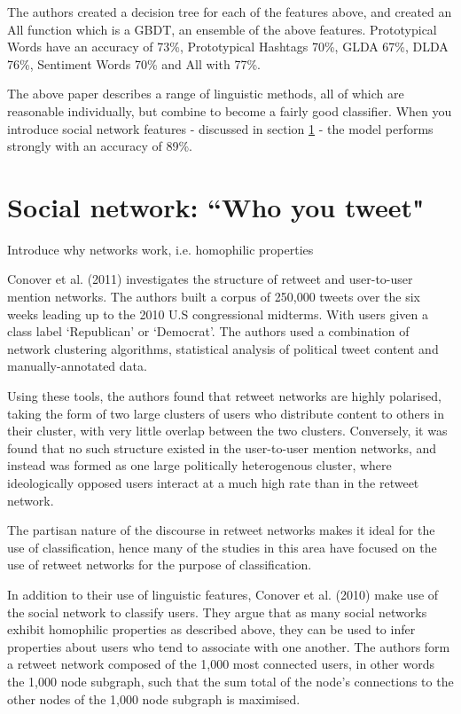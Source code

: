 \documentclass[bsc,frontabs,singlespacing,parskip]{infthesis}     %
\begin{document}
The authors created a decision tree for each of the features above, and created an All function which is a GBDT, an ensemble of the above features. Prototypical Words have an accuracy of 73\%, Prototypical Hashtags 70\%, GLDA 67\%, DLDA 76\%, Sentiment Words 70\% and All with 77\%. 

The above paper describes a range of linguistic methods, all of which are reasonable individually, but combine to become a fairly good classifier. When you introduce social network features - discussed in section \ref{sec:socnet} - the model performs strongly with an accuracy of 89\%. 

\section{Social network: ``Who you tweet"}
\label{sec:socnet}


Introduce why networks work, i.e. homophilic properties

Conover et al. (2011) \cite{politicalpolarisation} investigates the structure of retweet and user-to-user mention networks. The authors built a corpus of 250,000 tweets over the six weeks leading up to the 2010 U.S congressional midterms. With users given a class label `Republican' or `Democrat'. The authors used a combination of network clustering algorithms, statistical analysis of political tweet content and manually-annotated data. 

Using these tools, the authors found that retweet networks are highly polarised, taking the form of two large clusters of users who distribute content to others in their cluster, with very little overlap between the two clusters. Conversely, it was found that no such structure existed in the user-to-user mention networks, and instead was formed as one large politically heterogenous cluster, where ideologically opposed users interact at a much high rate than in the retweet network. 

The partisan nature of the discourse in retweet networks makes it ideal for the use of classification, hence many of the studies in this area have focused on the use of retweet networks for the purpose of classification.


In addition to their use of linguistic features, Conover et al. (2010) \cite{Conover2010predicting} make use of the social network to classify users. They argue that as many social networks exhibit homophilic properties as described above, they can be used to infer properties about users who tend to associate with one another. The authors form a retweet network composed of the 1,000 most connected users, in other words the 1,000 node subgraph, such that the sum total of the node's connections to the other nodes of the 1,000 node subgraph is maximised.
\end{document}
